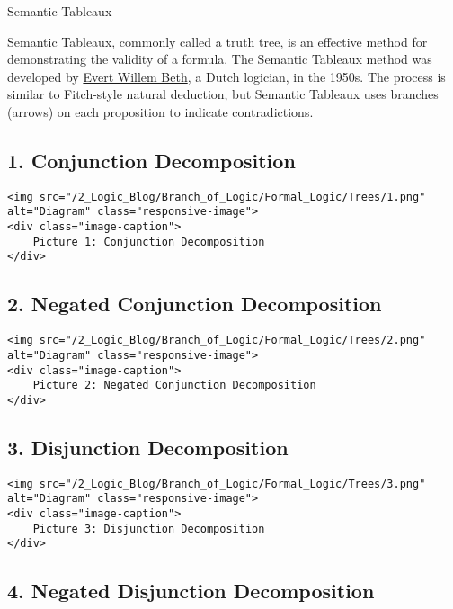 Semantic Tableaux

Semantic Tableaux, commonly called a truth tree, is an effective method
for demonstrating the validity of a formula. The Semantic Tableaux
method was developed by
\href{https://en.wikipedia.org/wiki/Evert_Willem_Beth}{Evert Willem
Beth}, a Dutch logician, in the 1950s. The process is similar to
Fitch-style natural deduction, but Semantic Tableaux uses branches
(arrows) on each proposition to indicate contradictions.

\subsection{1. Conjunction
Decomposition}\label{conjunction-decomposition}

\begin{verbatim}
<img src="/2_Logic_Blog/Branch_of_Logic/Formal_Logic/Trees/1.png" alt="Diagram" class="responsive-image">
<div class="image-caption">
    Picture 1: Conjunction Decomposition
</div>
\end{verbatim}

\subsection{2. Negated Conjunction
Decomposition}\label{negated-conjunction-decomposition}

\begin{verbatim}
<img src="/2_Logic_Blog/Branch_of_Logic/Formal_Logic/Trees/2.png" alt="Diagram" class="responsive-image">
<div class="image-caption">
    Picture 2: Negated Conjunction Decomposition
</div>
\end{verbatim}

\subsection{3. Disjunction
Decomposition}\label{disjunction-decomposition}

\begin{verbatim}
<img src="/2_Logic_Blog/Branch_of_Logic/Formal_Logic/Trees/3.png" alt="Diagram" class="responsive-image">
<div class="image-caption">
    Picture 3: Disjunction Decomposition
</div>
\end{verbatim}

\subsection{4. Negated Disjunction
Decomposition}\label{negated-disjunction-decomposition}

